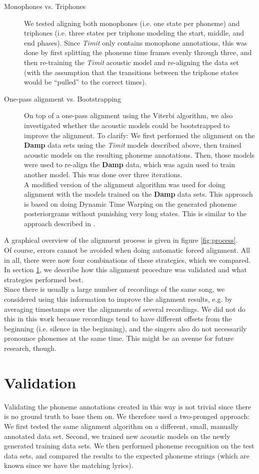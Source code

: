 \begin{description}
\item[Monophones vs. Triphones] We tested aligning both monophones (i.e. one state per phoneme) and triphones (i.e. three states per triphone modeling the start, middle, and end phases). Since \textit{Timit} only contains monophone annotations, this was done by first splitting the phoneme time frames evenly through three, and then re-training the \textit{Timit} acoustic model and re-aligning the data set (with the assumption that the transitions between the triphone states would be ``pulled'' to the correct times).  
\item[One-pass alignment vs. Bootstrapping] On top of a one-pass alignment using the Viterbi algorithm, we also investigated whether the acoustic models could be bootstrapped to improve the alignment. To clarify: We first performed the alignment on the \textbf{Damp} data sets using the \textit{Timit} models described above, then trained acoustic models on the resulting phoneme annotations. Then, those models were used to re-align the \textbf{Damp} data, which was again used to train another model. This was done over three iterations.\\
A modified version of the alignment algorithm was used for doing alignment with the models trained on the \textbf{Damp} data sets. This approach is based on doing Dynamic Time Warping on the generated phoneme posteriorgrams without punishing very long states. This is similar to the approach described in \cite{kruspe_lyrics_retrieval}.
\end{description}
A graphical overview of the alignment process is given in figure \ref{fig:process}.\\
Of course, errors cannot be avoided when doing automatic forced alignment. All in all, there were now four combinations of these strategies, which we compared. In section \ref{sec:validation}, we describe how this alignment procedure was validated and what strategies performed best.\\
Since there is usually a large number of recordings of the same song, we considered using this information to improve the alignment results, e.g. by averaging timestamps over the alignments of several recordings. We did not do this in this work because recordings tend to have different offsets from the beginning (i.e. silence in the beginning), and the singers also do not necessarily pronounce phonemes at the same time. This might be an avenue for future research, though.
\section{Validation}\label{sec:validation}
Validating the phoneme annotations created in this way is not trivial since there is no ground truth to base them on. We therefore used a two-pronged approach: We first tested the same alignment algorithm on a different, small, manually annotated data set. Second, we trained new acoustic models on the newly generated training data sets. We then performed phoneme recognition on the test data sets, and compared the results to the expected phoneme strings (which are known since we have the matching lyrics).
